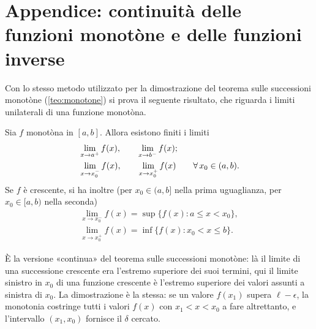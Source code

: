 \section{Appendice: continuità delle funzioni monotòne e delle funzioni inverse}
\label{sec:monotone-inverse}

Con lo stesso metodo utilizzato per la dimostrazione del teorema sulle successioni
monotòne (\cref{teo:monotone}) si prova il seguente risultato, che riguarda i limiti
unilaterali di una funzione monotòna.

\begin{teorema}\label{teo:limite-monotone-funzioni}
Sia $f$ monotòna in $[a,b]$. Allora esistono finiti i limiti
\begin{align}
  &\lim_{x\to a^{+}}f(x), \qquad \lim_{x\to b^{-}}f(x); \label{eq:monotone-estremi}\\
  &\lim_{x\to x_{0}^{-}}f(x), \qquad \lim_{x\to x_{0}^{+}}f(x) \qquad\forall\, x_{0}\in(a,b).
  \label{eq:monotone-interni}
\end{align}
Se $f$ è crescente, si ha inoltre (per $x_{0}\in(a,b]$ nella prima uguaglianza, per
$x_{0}\in[a,b)$ nella seconda)
\begin{equation}\label{eq:monotone-sup-inf}
\begin{gathered}
  \lim_{x\to x_{0}^{-}}f(x)=\sup\{f(x) : a\le x<x_{0}\}, \\
  \lim_{x\to x_{0}^{+}}f(x)=\inf\{f(x) : x_{0}<x\le b\} .
\end{gathered}
\end{equation}
\end{teorema}

\begin{schema}
\end{schema}

\begin{strategia}
È la versione «continua» del teorema sulle successioni monotòne: là il limite di una
successione crescente era l'estremo superiore dei suoi termini, qui il limite sinistro
in $x_{0}$ di una funzione crescente è l'estremo superiore dei valori assunti a sinistra
di $x_{0}$. La dimostrazione è la stessa: se un valore $f(x_{1})$ supera $\ell-\epsilon$,
la monotonia costringe tutti i valori $f(x)$ con $x_{1}<x<x_{0}$ a fare altrettanto, e
l'intervallo $(x_{1},x_{0})$ fornisce il $\delta$ cercato.
\end{strategia}

